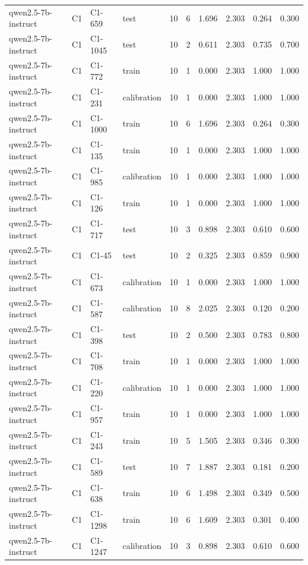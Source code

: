 \begin{table}
\begin{tabular}{llllrrrrrr}
qwen2.5-7b-instruct & C1 & C1-659 & test & 10 & 6 & 1.696 & 2.303 & 0.264 & 0.300 \\
qwen2.5-7b-instruct & C1 & C1-1045 & test & 10 & 2 & 0.611 & 2.303 & 0.735 & 0.700 \\
qwen2.5-7b-instruct & C1 & C1-772 & train & 10 & 1 & 0.000 & 2.303 & 1.000 & 1.000 \\
qwen2.5-7b-instruct & C1 & C1-231 & calibration & 10 & 1 & 0.000 & 2.303 & 1.000 & 1.000 \\
qwen2.5-7b-instruct & C1 & C1-1000 & train & 10 & 6 & 1.696 & 2.303 & 0.264 & 0.300 \\
qwen2.5-7b-instruct & C1 & C1-135 & train & 10 & 1 & 0.000 & 2.303 & 1.000 & 1.000 \\
qwen2.5-7b-instruct & C1 & C1-985 & calibration & 10 & 1 & 0.000 & 2.303 & 1.000 & 1.000 \\
qwen2.5-7b-instruct & C1 & C1-126 & train & 10 & 1 & 0.000 & 2.303 & 1.000 & 1.000 \\
qwen2.5-7b-instruct & C1 & C1-717 & test & 10 & 3 & 0.898 & 2.303 & 0.610 & 0.600 \\
qwen2.5-7b-instruct & C1 & C1-45 & test & 10 & 2 & 0.325 & 2.303 & 0.859 & 0.900 \\
qwen2.5-7b-instruct & C1 & C1-673 & calibration & 10 & 1 & 0.000 & 2.303 & 1.000 & 1.000 \\
qwen2.5-7b-instruct & C1 & C1-587 & calibration & 10 & 8 & 2.025 & 2.303 & 0.120 & 0.200 \\
qwen2.5-7b-instruct & C1 & C1-398 & test & 10 & 2 & 0.500 & 2.303 & 0.783 & 0.800 \\
qwen2.5-7b-instruct & C1 & C1-708 & train & 10 & 1 & 0.000 & 2.303 & 1.000 & 1.000 \\
qwen2.5-7b-instruct & C1 & C1-220 & calibration & 10 & 1 & 0.000 & 2.303 & 1.000 & 1.000 \\
qwen2.5-7b-instruct & C1 & C1-957 & train & 10 & 1 & 0.000 & 2.303 & 1.000 & 1.000 \\
qwen2.5-7b-instruct & C1 & C1-243 & train & 10 & 5 & 1.505 & 2.303 & 0.346 & 0.300 \\
qwen2.5-7b-instruct & C1 & C1-589 & test & 10 & 7 & 1.887 & 2.303 & 0.181 & 0.200 \\
qwen2.5-7b-instruct & C1 & C1-638 & train & 10 & 6 & 1.498 & 2.303 & 0.349 & 0.500 \\
qwen2.5-7b-instruct & C1 & C1-1298 & train & 10 & 6 & 1.609 & 2.303 & 0.301 & 0.400 \\
qwen2.5-7b-instruct & C1 & C1-1247 & calibration & 10 & 3 & 0.898 & 2.303 & 0.610 & 0.600 \\

\end{tabular}
\end{table}
